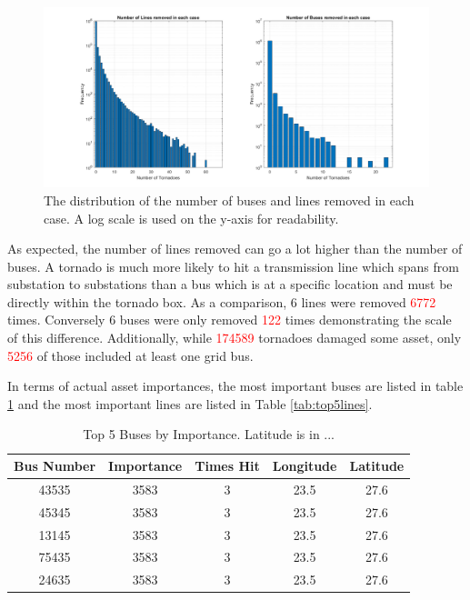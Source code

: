\documentclass[12pt]{article}
\begin{document}
\begin{figure}[H]
    \centering %
    \includegraphics[width=\textwidth]{Assettypesremovedincases.png}
    \caption[Distribution of buses and lines removed in each case]{The distribution of the number of buses and lines removed in each case. A log scale is used on the y-axis for readability.}
    \label{fig:Assettypesremovedincases}
\end{figure}

As expected, the number of lines removed can go a lot higher than the number of buses. A tornado is much more likely to hit a transmission line which spans from substation to substations than a bus which is at a specific location and must be directly within the tornado box. As a comparison, 6 lines were removed \textcolor{red}{6772} times. Conversely 6 buses were only removed \textcolor{red}{122} times demonstrating the scale of this difference. Additionally, while \textcolor{red}{174589} tornadoes damaged some asset, only \textcolor{red}{5256} of those included at least one grid bus. \par

In terms of actual asset importances, the most important buses are listed in table \ref{tab:top5buses} and the most important lines are listed in Table \ref{tab:top5lines}.

\begin{table}[ht]
    \centering
    \begin{tabular}{ccccc}
        \toprule
        Bus Number & Importance & Times Hit & Longitude & Latitude \\
        \midrule
        43535 & 3583 & 3 & 23.5 & 27.6 \\
        45345 & 3583 & 3 & 23.5 & 27.6 \\
        13145 & 3583 & 3 & 23.5 & 27.6 \\
        75435 & 3583 & 3 & 23.5 & 27.6 \\
        24635 & 3583 & 3 & 23.5 & 27.6 \\
        \bottomrule
    \end{tabular}
    \caption{Top 5 Buses by Importance. Latitude is in ...}
    \label{tab:top5buses}
\end{table}
\end{document}
